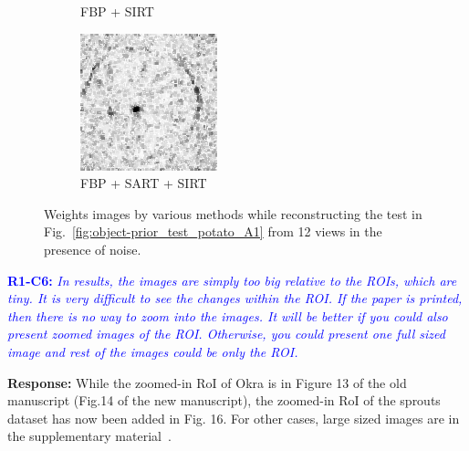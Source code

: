 \documentclass{article}
\begin{document}
\begin{figure}[!h]
\begin{subfigure}[b]{0.2\linewidth}
\captionsetup{labelformat=empty}
        \caption{FBP + SIRT}
    \end{subfigure}
    \quad
        \begin{subfigure}[b]{0.2\linewidth}
        \includegraphics[width=\textwidth]{../images/potato/artefacts/with_noise/weightsIm_fbp_sart_sirt30.png}
\captionsetup{labelformat=empty}
        \caption{FBP + SART + SIRT}
     \end{subfigure}
      \caption{Weights images by various methods while reconstructing the test in Fig.~\ref{fig:object-prior_test_potato_A1} from 12 views in the presence of noise.}
\label{fig:weights_with_noise}
\end{figure}

\textcolor{blue}{\textbf{R1-C6:}\textit{ In results, the images are simply too big relative to the ROIs, which are tiny. It is very difficult to see the changes within the ROI. If the paper is printed, then there is no way to zoom into the images. It will be better if you could also present zoomed images of the ROI. Otherwise, you could present one full sized image and rest of the images could be only the ROI. }}

\textbf{Response:} While the zoomed-in RoI of Okra is in Figure 13 of the old manuscript (Fig.14 of the new manuscript), the zoomed-in RoI of the sprouts dataset has now been added in Fig. 16.  For other cases, large sized images are in the supplementary material~\cite{supp_paper}.\\
\end{document}
